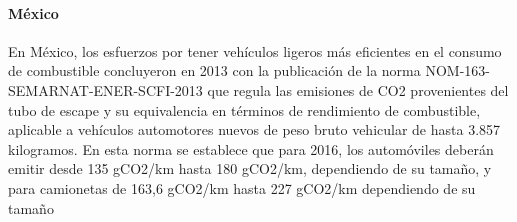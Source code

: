 \paragraph{México}
En México, los esfuerzos por tener vehículos ligeros más eficientes en el consumo de combustible concluyeron en 2013 con la publicación de la norma NOM-163-SEMARNAT-ENER-SCFI-2013 que regula las emisiones de CO2 provenientes del tubo de escape y su equivalencia en términos de rendimiento de combustible, aplicable a vehículos automotores nuevos de peso bruto vehicular de hasta 3.857 kilogramos. En esta norma se establece que para 2016, los automóviles deberán emitir desde 135 gCO2/km hasta 180 gCO2/km, dependiendo de su tamaño, y para camionetas de 163,6 gCO2/km hasta 227 gCO2/km dependiendo de su tamaño \cite{NOM-163}
